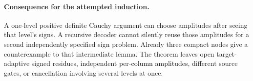 \documentclass{article}
\begin{document}
\paragraph{Consequence for the attempted induction.}
A one-level positive definite Cauchy argument can choose amplitudes after
seeing that level's signs. A recursive decoder cannot silently reuse those
amplitudes for a second independently specified sign problem. Already
three compact nodes give a counterexample to that intermediate lemma.
The theorem leaves open target-adaptive signed residues, independent
per-column amplitudes, different source gates, or cancellation involving
several levels at once.
\end{document}
